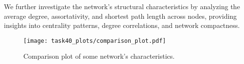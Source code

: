 We further investigate the network’s structural characteristics by analyzing the average degree, assortativity, and shortest path length across nodes, providing insights into centrality patterns, degree correlations, and network compactness.

\begin{figure}[h!]
    \centering
    \texttt{[image: task40\_plots/comparison\_plot.pdf]}
    \caption{Comparison plot of some network's characteristics.}
    \label{fig:comparison_plot}
\end{figure}